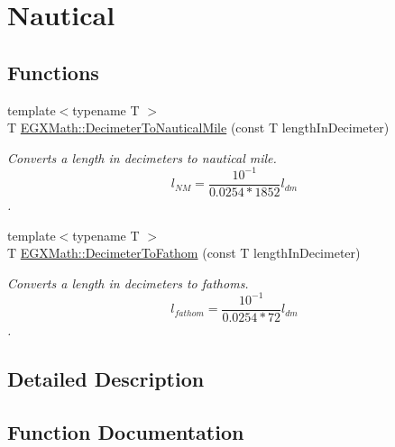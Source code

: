 \hypertarget{group___e_g_x_math-_conversions-_length_conversions-_decimeter-_nautical}{}\section{Nautical}
\label{group___e_g_x_math-_conversions-_length_conversions-_decimeter-_nautical}
\subsection*{Functions}
\begin{DoxyCompactItemize}
\item 
{\footnotesize template$<$typename T $>$ }\\T \mbox{\hyperlink{group___e_g_x_math-_conversions-_length_conversions-_decimeter-_nautical_ga6cc0e9987da30da6a30ddba50971ba2d}{E\+G\+X\+Math\+::\+Decimeter\+To\+Nautical\+Mile}} (const T length\+In\+Decimeter)
\begin{DoxyCompactList}\small\item\em Converts a length in decimeters to nautical mile. \[ l_{NM}= \frac{10^{-1}}{0.0254 * 1852} l_{dm} \]. \end{DoxyCompactList}\item 
{\footnotesize template$<$typename T $>$ }\\T \mbox{\hyperlink{group___e_g_x_math-_conversions-_length_conversions-_decimeter-_nautical_ga1b0035d719274942290afe80600a2b27}{E\+G\+X\+Math\+::\+Decimeter\+To\+Fathom}} (const T length\+In\+Decimeter)
\begin{DoxyCompactList}\small\item\em Converts a length in decimeters to fathoms. \[ l_{fathom}= \frac{10^{-1}}{0.0254 * 72} l_{dm} \]. \end{DoxyCompactList}\end{DoxyCompactItemize}


\subsection{Detailed Description}


\subsection{Function Documentation}
\mbox{\label{group___e_g_x_math-_conversions-_length_conversions-_decimeter-_nautical_ga1b0035d719274942290afe80600a2b27}} 
